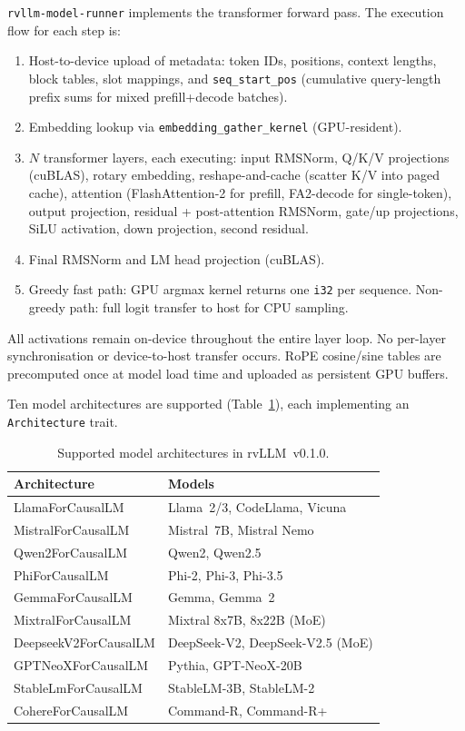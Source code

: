 \documentclass[11pt,a4paper]{article}
\newcommand{\thead}[1]{\textbf{\color{white}#1}}
\begin{document}
\texttt{rvllm-model-runner} implements the transformer forward pass. The execution
flow for each step is:
\begin{enumerate}
  \item Host-to-device upload of metadata: token IDs, positions, context lengths,
        block tables, slot mappings, and \texttt{seq\_start\_pos} (cumulative
        query-length prefix sums for mixed prefill+decode batches).
  \item Embedding lookup via \texttt{embedding\_gather\_kernel} (GPU-resident).
  \item $N$ transformer layers, each executing: input RMSNorm, Q/K/V projections
        (cuBLAS), rotary embedding, reshape-and-cache (scatter K/V into paged cache),
        attention (FlashAttention-2 for prefill, FA2-decode for single-token), output
        projection, residual + post-attention RMSNorm, gate/up projections,
        SiLU activation, down projection, second residual.
  \item Final RMSNorm and LM head projection (cuBLAS).
  \item Greedy fast path: GPU argmax kernel returns one \texttt{i32} per sequence.
        Non-greedy path: full logit transfer to host for CPU sampling.
\end{enumerate}

All activations remain on-device throughout the entire layer loop. No per-layer
synchronisation or device-to-host transfer occurs. RoPE cosine/sine tables are
precomputed once at model load time and uploaded as persistent GPU buffers.

Ten model architectures are supported (Table~\ref{tab:architectures}), each
implementing an \texttt{Architecture} trait.

\begin{table}[t]
  \centering
  \caption{Supported model architectures in rvLLM~v0.1.0.}
  \label{tab:architectures}
  \small
  \begin{tabular}{@{}ll@{}}
    \toprule
    \rowcolor{HeaderBlue} \thead{Architecture} & \thead{Models} \\
    \midrule
    LlamaForCausalLM      & Llama~2/3, CodeLlama, Vicuna \\
    \rowcolor{gray!8}
    MistralForCausalLM     & Mistral~7B, Mistral Nemo \\
    Qwen2ForCausalLM       & Qwen2, Qwen2.5 \\
    \rowcolor{gray!8}
    PhiForCausalLM         & Phi-2, Phi-3, Phi-3.5 \\
    GemmaForCausalLM       & Gemma, Gemma~2 \\
    \rowcolor{gray!8}
    MixtralForCausalLM     & Mixtral 8x7B, 8x22B (MoE) \\
    DeepseekV2ForCausalLM  & DeepSeek-V2, DeepSeek-V2.5 (MoE) \\
    \rowcolor{gray!8}
    GPTNeoXForCausalLM     & Pythia, GPT-NeoX-20B \\
    StableLmForCausalLM    & StableLM-3B, StableLM-2 \\
    \rowcolor{gray!8}
    CohereForCausalLM      & Command-R, Command-R+ \\
    \bottomrule
  \end{tabular}
\end{table}
\end{document}
